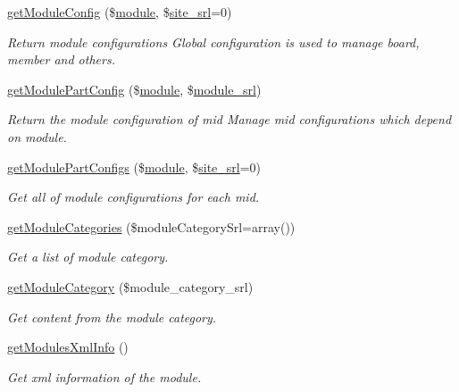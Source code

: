 \begin{DoxyCompactItemize}
\hyperlink{classmoduleModel_ae8005c8ab7ee3b9e6ddd7f71bb2b4698}{get\+Module\+Config} (\$\hyperlink{classmodule}{module}, \$\hyperlink{ko_8install_8php_a8b1406b4ad1048041558dce6bfe89004}{site\+\_\+srl}=0)
\begin{DoxyCompactList}\small\item\em Return module configurations Global configuration is used to manage board, member and others. \end{DoxyCompactList}\item 
\hyperlink{classmoduleModel_acfd93d46c26d88c3833b0801085e69ba}{get\+Module\+Part\+Config} (\$\hyperlink{classmodule}{module}, \$\hyperlink{ko_8install_8php_a370bb6450fab1da3e0ed9f484a38b761}{module\+\_\+srl})
\begin{DoxyCompactList}\small\item\em Return the module configuration of mid Manage mid configurations which depend on module. \end{DoxyCompactList}\item 
\hyperlink{classmoduleModel_a3e50f170f709853c8adf5c8f759e08ca}{get\+Module\+Part\+Configs} (\$\hyperlink{classmodule}{module}, \$\hyperlink{ko_8install_8php_a8b1406b4ad1048041558dce6bfe89004}{site\+\_\+srl}=0)
\begin{DoxyCompactList}\small\item\em Get all of module configurations for each mid. \end{DoxyCompactList}\item 
\hyperlink{classmoduleModel_a253e39c41e241e2f3fa914ce5d915963}{get\+Module\+Categories} (\$module\+Category\+Srl=array())
\begin{DoxyCompactList}\small\item\em Get a list of module category. \end{DoxyCompactList}\item 
\hyperlink{classmoduleModel_a75669086647f78470306c840c22f36b1}{get\+Module\+Category} (\$module\+\_\+category\+\_\+srl)
\begin{DoxyCompactList}\small\item\em Get content from the module category. \end{DoxyCompactList}\item 
\hyperlink{classmoduleModel_ab0740093a121db65a8d65777fdcd8f00}{get\+Modules\+Xml\+Info} ()
\begin{DoxyCompactList}\small\item\em Get xml information of the module. \end{DoxyCompactList}\item 

\end{DoxyCompactItemize}
